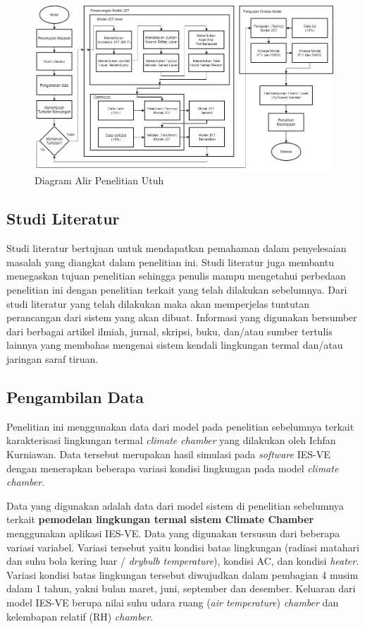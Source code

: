 \begin{landscape}
	\begin{figure}[!h]
		\centering
		\includegraphics[width=1.5\textwidth]{figures/DiagramPenelitianFull}
		\caption{Diagram Alir Penelitian Utuh}
		\label{fig:4:DiagramPenelitianFull}
	\end{figure}
\end{landscape}

\subsection{Studi Literatur}
Studi literatur bertujuan untuk mendapatkan pemahaman dalam penyelesaian masalah yang diangkat dalam penelitian ini. Studi literatur juga membantu menegaskan tujuan penelitian sehingga penulis mampu mengetahui perbedaan penelitian ini dengan penelitian terkait yang telah dilakukan sebelumnya. Dari studi literatur yang telah dilakukan maka akan memperjelas tuntutan perancangan dari sistem yang akan dibuat. Informasi yang digunakan bersumber dari berbagai artikel ilmiah, jurnal, skripsi, buku, dan/atau sumber tertulis lainnya yang membahas mengenai sistem kendali lingkungan termal dan/atau jaringan saraf tiruan.

\subsection{Pengambilan Data}
Penelitian ini menggunakan data dari model pada penelitian sebelumnya terkait karakterisasi lingkungan termal \textit{climate chamber} yang dilakukan oleh Ichfan Kurniawan. Data tersebut merupakan hasil simulasi pada \textit{software} IES-VE dengan menerapkan beberapa variasi kondisi lingkungan pada model \textit{climate chamber}.

Data yang digunakan adalah data dari model sistem di penelitian sebelumnya terkait \textbf{pemodelan lingkungan termal sistem Climate Chamber} menggunakan aplikasi IES-VE. Data yang digunakan tersusun dari beberapa variasi variabel. Variasi tersebut yaitu kondisi batas lingkungan (radiasi matahari dan suhu bola kering luar / \textit{drybulb temperature}), kondisi AC, dan kondisi \textit{heater}. Variasi kondisi batas lingkungan tersebut diwujudkan dalam pembagian 4 musim dalam 1 tahun, yakni bulan maret, juni, september dan desember. Keluaran dari model IES-VE berupa nilai suhu udara ruang (\textit{air temperature}) \textit{chamber} dan kelembapan relatif (RH) \textit{chamber}.

